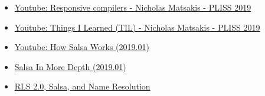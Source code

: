 \documentclass[10pt, a4paper]{report}
\begin{document}
\begin{itemize}[noitemsep]
\item \href{https://www.youtube.com/watch?v=N6b44kMS6OM}{Youtube: Responsive compilers - Nicholas Matsakis - PLISS 2019}
\item \href{https://www.youtube.com/watch?v=LIYkT3p5gTs}{Youtube: Things I Learned (TIL) - Nicholas Matsakis - PLISS 2019}
\item \href{https://www.youtube.com/watch?v=_muY4HjSqVw}{Youtube: How Salsa Works (2019.01)}
\item \href{https://www.youtube.com/watch?v=i_IhACacPRY}{Salsa In More Depth (2019.01)}
\item \href{https://www.youtube.com/watch?v=Xr-rBqLr-G4}{RLS 2.0, Salsa, and Name Resolution}
\end{itemize}
\end{document}
